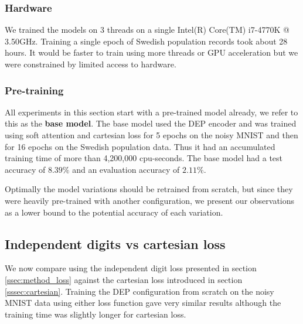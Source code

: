\subsubsection{Hardware}
We trained the models on 3 threads on a single Intel(R) Core(TM) i7-4770K @ 3.50GHz. Training a single epoch of Swedish population records took about 28 hours. It would be faster to train using more threads or GPU acceleration but we were constrained by limited access to hardware.


\subsubsection{Pre-training}

All experiments in this section start with a pre-trained model already, we refer to this as the \textbf{base model}. The base model used the DEP encoder and was trained using soft attention and cartesian loss for 5 epochs on the noisy MNIST and then for 16 epochs on the Swedish population data. Thus it had an accumulated training time of more than 4,200,000 cpu-seconds.
The base model had a test accuracy of $8.39\%$ and an evaluation accuracy of $2.11\%$.

Optimally the model variations should be retrained from scratch, but since they were heavily pre-trained with another configuration, we present our observations as a lower bound to the potential accuracy of each variation.




\subsection{Independent digits vs cartesian loss} \label{sssec:ind_digits}

We now compare using the independent digit loss presented in section \ref{ssec:method_loss} against the cartesian loss introduced in section \ref{sssec:cartesian}.
Training the DEP configuration from scratch on the noisy MNIST data using either loss function gave very similar results although the training time was slightly longer for cartesian loss.

